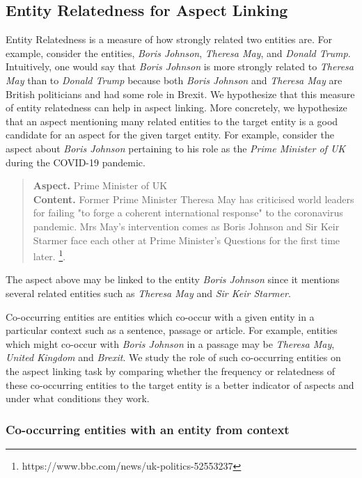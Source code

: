 \subsection{Entity Relatedness for Aspect Linking}
\label{subsec:Entity Relatedness for Aspect Linking}

Entity Relatedness is a measure of how strongly related two entities are. For example, consider the entities, \textit{Boris Johnson}, \textit{Theresa May}, and \textit{Donald Trump}. Intuitively, one would say that \textit{Boris Johnson} is more strongly related to \textit{Theresa May} than to \textit{Donald Trump} because both \textit{Boris Johnson} and \textit{Theresa May} are British politicians and had some role in Brexit. We hypothesize that this measure of entity relatedness can help in aspect linking. More concretely, we hypothesize that an aspect mentioning many related entities to the target entity  is a good candidate for an aspect for the given target entity. For example, consider the aspect about \textit{Boris Johnson} pertaining to his role as the \textit{Prime Minister of UK} during the COVID-19 pandemic.

\begin{quote}
    \textbf{Aspect.} Prime Minister of UK \\
    \textbf{Content.}
    Former Prime Minister Theresa May has criticised world leaders for failing "to forge a coherent international response" to the coronavirus pandemic. Mrs May's intervention comes as Boris Johnson and Sir Keir Starmer face each other at Prime Minister's Questions for the first time later. \footnote{https://www.bbc.com/news/uk-politics-52553237}.
\end{quote}
The aspect above may be linked to the entity \textit{Boris Johnson} since it mentions several related entities such as \textit{Theresa May} and \textit{Sir Keir Starmer}. 

Co-occurring entities are entities which co-occur with a given entity in a particular context such as a sentence, passage or article. For example, entities which might co-occur with \textit{Boris Johnson} in a passage may be \textit{Theresa May}, \textit{United Kingdom} and \textit{Brexit}. We study the role of such co-occurring entities on the aspect linking task by comparing whether the frequency or relatedness of these co-occurring entities to the target entity is a better indicator of aspects and under what conditions they work. 


\subsubsection{Co-occurring entities with an entity from context}
\label{subsubsec:Co-occurring entities with an entity from context}

